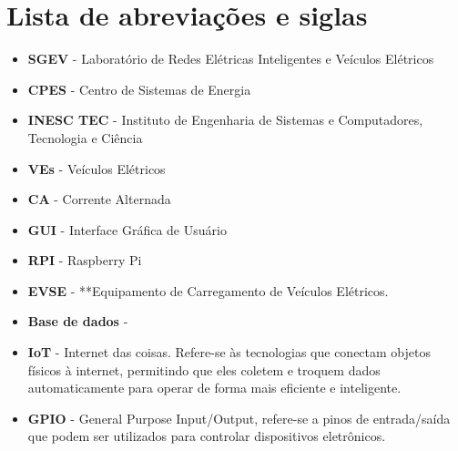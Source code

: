 \section{Lista de abreviações e siglas}

\begin{itemize}
    \item \textbf{SGEV} - Laboratório de Redes Elétricas Inteligentes e Veículos Elétricos
    \item \textbf{CPES} - Centro de Sistemas de Energia
    \item \textbf{INESC TEC} - Instituto de Engenharia de Sistemas e Computadores, Tecnologia e Ciência
    \item \textbf{VEs} - Veículos Elétricos
    \item \textbf{CA} - Corrente Alternada
    \item \textbf{GUI} - Interface Gráfica de Usuário
    \item \textbf{RPI} - Raspberry Pi
    \item \textbf{EVSE} - **Equipamento de Carregamento de Veículos Elétricos.
    \item \textbf{Base de dados} - 
    \item \textbf{IoT} - Internet das coisas. Refere-se às tecnologias que conectam objetos físicos à internet, permitindo que eles coletem e troquem dados automaticamente para operar de forma mais eficiente e inteligente.
    \item \textbf{GPIO} - General Purpose Input/Output, refere-se a pinos de entrada/saída que podem ser utilizados para controlar dispositivos eletrônicos.
\end{itemize}\